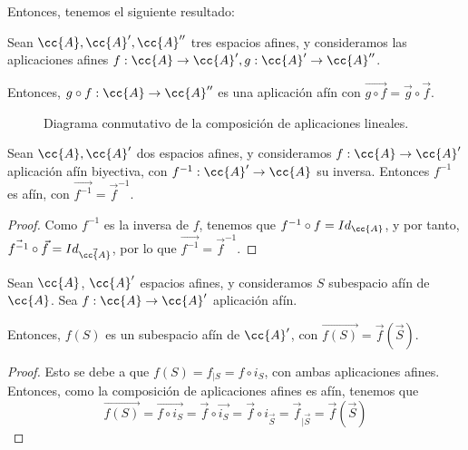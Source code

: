 Entonces, tenemos el siguiente resultado:
\begin{prop} Sean $\cc{A},\cc{A}', \cc{A}''$ tres espacios afines, y consideramos las aplicaciones afines $f:\cc{A}\to \cc{A}', g:\cc{A}'\to \cc{A}''$.

Entonces, $g\circ f:\cc{A}\to \cc{A}''$ es una aplicación afín con $\vec{g\circ f} = \vec{g}\circ \vec{f}$.
\begin{figure}[H]
    \centering
    \caption{Diagrama conmutativo de la composición de aplicaciones lineales.}
    \label{fig:cd:ApLineal_Comp}
\end{figure}
\end{prop}

\begin{coro}
    Sean $\cc{A},\cc{A}'$ dos espacios afines, y consideramos $f:\cc{A}\to \cc{A}'$ aplicación afín biyectiva, con $f^{-1}:\cc{A}'\to \cc{A}$ su inversa.
    Entonces $f^{-1}$ es afín, con $\vec{f^{-1}} = \vec{f}^{-1}$.
\end{coro}
\begin{proof}
    Como $f^{-1}$ es la inversa de $f$, tenemos que $f^{-1}\circ f = Id_{\cc{A}}$, y por tanto, $\vec{f^{-1}}\circ \vec{f} = Id_{\vec{\cc{A}}}$, por lo que $\vec{f^{-1}} = \vec{f}^{-1}$.
\end{proof}

\begin{coro}
    Sean $\cc{A}$, $\cc{A}'$ espacios afines, y consideramos $S$ subespacio afín de $\cc{A}$. Sea $f:\cc{A}\to \cc{A}'$ aplicación afín.
    
    Entonces, $f(S)$ es un subespacio afín de $\cc{A}'$, con $\vec{f(S)} = \vec{f}\left(\vec{S}\right)$.
\end{coro}
\begin{proof}
    Esto se debe a que $f(S)=f_{\big| S} = f\circ i_S$, con ambas aplicaciones afines. Entonces, como la composición de aplicaciones afines es afín, tenemos que $$\vec{f(S)}=\vec{f\circ i_S} = \vec{f}\circ \vec{i_S} = \vec{f}\circ i_{\vec{S}} = \vec{f}_{\big| \vec{S}} = \vec{f}\left(\vec{S}\right)$$
\end{proof}


